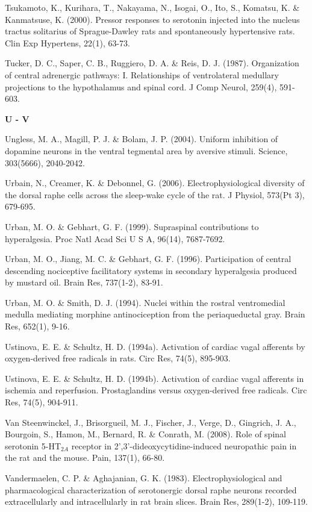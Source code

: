\documentclass[a4paper,12pt,twoside]{report}
\begin{document}
\begin{singlespacing}
\begin{footnotesize}
Tsukamoto, K., Kurihara, T., Nakayama, N., Isogai, O., Ito, S., Komatsu, K. \& Kanmatsuse, K. (2000). Pressor responses to serotonin injected into the nucleus tractus solitarius of Sprague-Dawley rats and spontaneously hypertensive rats. Clin Exp Hypertens, 22(1), 63-73.

Tucker, D. C., Saper, C. B., Ruggiero, D. A. \& Reis, D. J. (1987). Organization of central adrenergic pathways: I. Relationships of ventrolateral medullary projections to the hypothalamus and spinal cord. J Comp Neurol, 259(4), 591-603.

\medskip
\begin{Large}\textbf{U - V}\end{Large}

Ungless, M. A., Magill, P. J. \& Bolam, J. P. (2004). Uniform inhibition of dopamine neurons in the ventral tegmental area by aversive stimuli. Science, 303(5666), 2040-2042.

Urbain, N., Creamer, K. \& Debonnel, G. (2006). Electrophysiological diversity of the dorsal raphe cells across the sleep-wake cycle of the rat. J Physiol, 573(Pt 3), 679-695.

Urban, M. O. \& Gebhart, G. F. (1999). Supraspinal contributions to hyperalgesia. Proc Natl Acad Sci U S A, 96(14), 7687-7692.

Urban, M. O., Jiang, M. C. \& Gebhart, G. F. (1996). Participation of central descending nociceptive facilitatory systems in secondary hyperalgesia produced by mustard oil. Brain Res, 737(1-2), 83-91.

Urban, M. O. \& Smith, D. J. (1994). Nuclei within the rostral ventromedial medulla mediating morphine antinociception from the periaqueductal gray. Brain Res, 652(1), 9-16.

Ustinova, E. E. \& Schultz, H. D. (1994a). Activation of cardiac vagal afferents by oxygen-derived free radicals in rats. Circ Res, 74(5), 895-903.

Ustinova, E. E. \& Schultz, H. D. (1994b). Activation of cardiac vagal afferents in ischemia and reperfusion. Prostaglandins versus oxygen-derived free radicals. Circ Res, 74(5), 904-911.

Van Steenwinckel, J., Brisorgueil, M. J., Fischer, J., Verge, D., Gingrich, J. A., Bourgoin, S., Hamon, M., Bernard, R. \& Conrath, M. (2008). Role of spinal serotonin 5-HT$_{2A}$ receptor in 2',3'-dideoxycytidine-induced neuropathic pain in the rat and the mouse. Pain, 137(1), 66-80.

Vandermaelen, C. P. \& Aghajanian, G. K. (1983). Electrophysiological and pharmacological characterization of serotonergic dorsal raphe neurons recorded extracellularly and intracellularly in rat brain slices. Brain Res, 289(1-2), 109-119.


\end{footnotesize}
\end{singlespacing}
\end{document}
